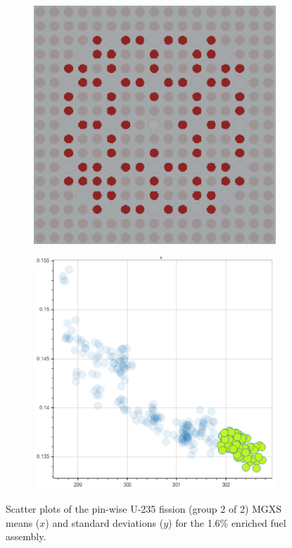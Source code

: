 \begin{figure}[h!]
\begin{subfigure}{0.45\textwidth}
  \caption{}
  \label{fig:chap10-fiss-mean-std-mgxs-2}
\end{subfigure}
\begin{subfigure}{0.45\textwidth}
  \centering
  \includegraphics[width=0.9\linewidth]{figures/unsupervised/features/assm-16/u235-fiss/mean-std/geometry-3}
  \caption{}
  \label{fig:chap10-fiss-mean-std-geom-3}
\end{subfigure}%
\begin{subfigure}{0.45\textwidth}
  \centering
  \includegraphics[width=0.9\linewidth]{figures/unsupervised/features/assm-16/u235-fiss/mean-std/mgxs-3}
  \caption{}
  \label{fig:chap10-fiss-mean-std-mgxs-3}
\end{subfigure}
\caption[Clustering of U-235 fission MGXS standard deviations]{Scatter plots of the pin-wise U-235 fission (group 2 of 2) \ac{MGXS} means ($x$) and standard deviations ($y$) for the 1.6\% enriched fuel assembly.}
\label{fig:chap10-fiss-mean-std}
\end{figure}

